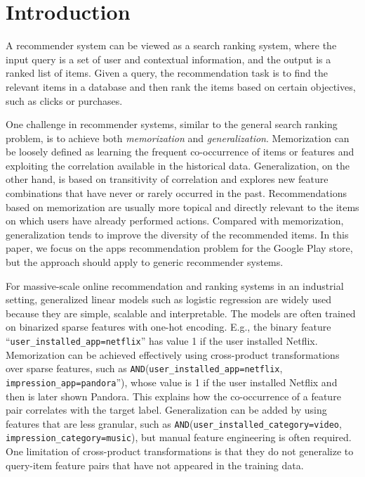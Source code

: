 \documentclass{sig-alternate-05-2015}
\begin{document}
%

\printccsdesc


\section{Introduction}
A recommender system can be viewed as a search ranking system, where the input query is a set of user and contextual information, and the output is a ranked list of items. Given a query, the recommendation task is to find the relevant items in a database and then rank the items based on certain objectives, such as clicks or purchases.

One challenge in recommender systems, similar to the general search ranking problem, is to achieve both \textit{memorization} and \textit{generalization}.
Memorization can be loosely defined as learning the frequent co-occurrence of items or features and exploiting the correlation available in the historical data. Generalization, on the other hand, is based on transitivity of correlation and explores new feature combinations that have never or rarely occurred in the past.
Recommendations based on memorization are usually more topical and directly relevant to the items on which users have already performed actions.
Compared with memorization, generalization tends to improve the diversity of the recommended items. In this paper, we focus on the apps recommendation problem for the Google Play store, but the approach should apply to generic recommender systems.

For massive-scale online recommendation and ranking systems in an industrial setting, generalized linear models such as logistic regression are widely used because they are simple, scalable and interpretable. The models are often trained on binarized sparse features with one-hot encoding. E.g., the binary feature ``\texttt{user\_installed\_app=netflix}'' has value 1 if the user installed Netflix. Memorization can be achieved effectively using cross-product transformations over sparse features, such as  \texttt{AND}(\texttt{user\_installed\_app=netflix}, \texttt{impression\_app=pandora}''), whose value is 1 if the user installed Netflix and then is later shown Pandora. This explains how the co-occurrence of a feature pair correlates with the target label. Generalization can be added by using features that are less granular, such as \texttt{AND}(\texttt{user\_installed\_category=video}, \texttt{impression\_category=music}), but manual feature engineering is often required. One limitation of cross-product transformations is that they do not generalize to query-item feature pairs that have not appeared in the training data.
\end{document}
